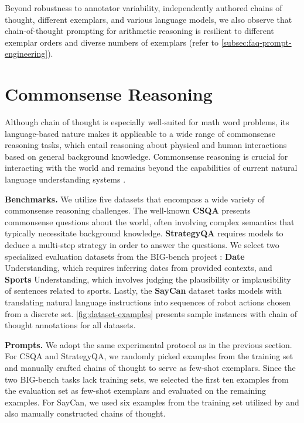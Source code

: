 Beyond robustness to annotator variability, independently authored chains of thought, different exemplars, and various language models, we also observe that chain-of-thought prompting for arithmetic reasoning is resilient to different exemplar orders and diverse numbers of exemplars (refer to \cref{subsec:faq-prompt-engineering}).

\section{Commonsense Reasoning}\label{sec:commonsense-reasoning}

Although chain of thought is especially well-suited for math word problems, its language-based nature makes it applicable to a wide range of commonsense reasoning tasks, which entail reasoning about physical and human interactions based on general background knowledge. Commonsense reasoning is crucial for interacting with the world and remains beyond the capabilities of current natural language understanding systems \citep{talmor2022commonsenseqa}.

\textbf{Benchmarks.}  
We utilize five datasets that encompass a wide variety of commonsense reasoning challenges. The well-known \textbf{CSQA} \citep{talmor-etal-2019-commonsenseqa} presents commonsense questions about the world, often involving complex semantics that typically necessitate background knowledge.  
\textbf{StrategyQA} \citep{geva-etal-2021-aristotle} requires models to deduce a multi-step strategy in order to answer the questions. We select two specialized evaluation datasets from the BIG-bench project \citep{bigbench}: \textbf{Date} Understanding, which requires inferring dates from provided contexts, and \textbf{Sports} Understanding, which involves judging the plausibility or implausibility of sentences related to sports. Lastly, the \textbf{SayCan} dataset \citep{ahn2022can} tasks models with translating natural language instructions into sequences of robot actions chosen from a discrete set.  
\cref{fig:dataset-examples} presents sample instances with chain of thought annotations for all datasets.

\textbf{Prompts.}  
We adopt the same experimental protocol as in the previous section. For CSQA and StrategyQA, we randomly picked examples from the training set and manually crafted chains of thought to serve as few-shot exemplars. Since the two BIG-bench tasks lack training sets, we selected the first ten examples from the evaluation set as few-shot exemplars and evaluated on the remaining examples. For SayCan, we used six examples from the training set utilized by \citet{ahn2022can} and also manually constructed chains of thought.


